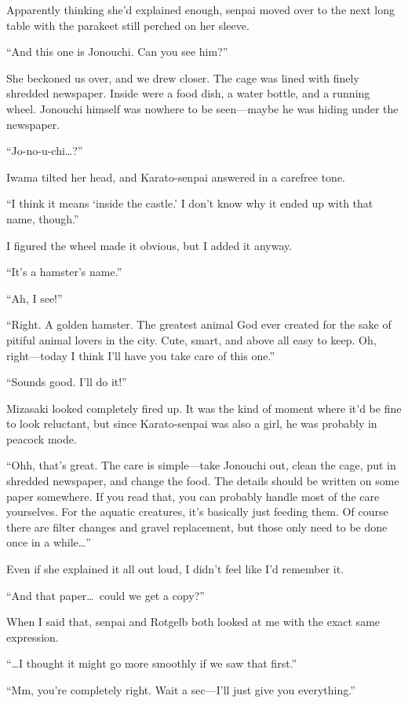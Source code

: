\documentclass[
    a4paper,
    12pt,
    twoside,
    openany,
    UTF8,
    fontset=windows
]{ctexbook}
\begin{document}
Apparently thinking she'd explained enough, senpai moved over to the next long table with the parakeet still perched on her sleeve.

``And this one is Jonouchi. Can you see him?''

She beckoned us over, and we drew closer. The cage was lined with finely shredded newspaper. Inside were a food dish, a water bottle, and a running wheel. Jonouchi himself was nowhere to be seen---maybe he was hiding under the newspaper.

``Jo-no-u-chi\dots?''

Iwama tilted her head, and Karato-senpai answered in a carefree tone.

``I think it means `inside the castle.' I don't know why it ended up with that name, though.''

I figured the wheel made it obvious, but I added it anyway.

``It's a hamster's name.''

``Ah, I see!''

``Right. A golden hamster. The greatest animal God ever created for the sake of pitiful animal lovers in the city. Cute, smart, and above all easy to keep. Oh, right---today I think I'll have you take care of this one.''

``Sounds good. I'll do it!''

Mizasaki looked completely fired up. It was the kind of moment where it'd be fine to look reluctant, but since Karato-senpai was also a girl, he was probably in peacock mode.

``Ohh, that's great. The care is simple---take Jonouchi out, clean the cage, put in shredded newspaper, and change the food. The details should be written on some paper somewhere. If you read that, you can probably handle most of the care yourselves. For the aquatic creatures, it's basically just feeding them. Of course there are filter changes and gravel replacement, but those only need to be done once in a while\dots''

Even if she explained it all out loud, I didn't feel like I'd remember it.

``And that paper\dots\ could we get a copy?''

When I said that, senpai and Rotgelb both looked at me with the exact same expression.

``\dots I thought it might go more smoothly if we saw that first.''

``Mm, you're completely right. Wait a sec---I'll just give you everything.''
\end{document}
